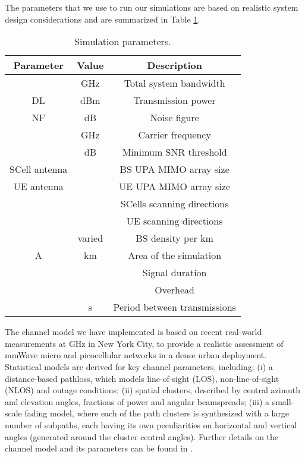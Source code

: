 \documentclass[conference,a4paper]{IEEEtran}
\renewcommand{\arraystretch}{2}
\begin{document}
The parameters that we use to run our simulations are based on realistic system design considerations and are summarized in Table \ref{tab:params}.
 \renewcommand{\arraystretch}{1.3}
\begin{table}[!t]
\centering
\begin{tabular}{|c|c|c|}
\hline
\textbf{Parameter} & \textbf{Value} & \textbf{Description}\\
\toprule
\hline
  &  GHz & Total system bandwidth\\
\hline
DL   &  dBm & Transmission power \\
\hline
 NF  &  dB & Noise figure \\
\hline
 &  GHz & Carrier frequency \\
\hline
 &  dB &  Minimum SNR threshold \\
\hline
  SCell antenna &   & BS UPA MIMO array size  \\
\hline
UE antenna &  & UE UPA MIMO array size\\
\hline
&   & SCells scanning directions  \\
\hline
&   & UE scanning directions  \\
\hline
  & varied & BS density per km \\
\hline
 A &  km & Area of the simulation \\
\hline
 & & Signal duration \\
\hline
 &  & Overhead\\
\hline
 & s & Period between transmissions \\
\hline
\end{tabular}
\caption{Simulation parameters.}
\label{tab:params}
\end{table}

The channel model we have implemented is based on recent real-world measurements at  GHz in New York City, to provide a realistic assessment of mmWave micro and picocellular networks in a dense urban deployment. Statistical models are derived for key channel parameters, including: (i) a distance-based pathloss, which models line-of-sight (LOS), non-line-of-sight (NLOS) and outage conditions; (ii) spatial clusters, described by central azimuth and elevation angles, fractions of power and angular beamspreads;  (iii) a small-scale fading model, where each of the path clusters is synthesized with a large number of subpaths, each  having its own peculiarities on horizontal and vertical angles (generated around the cluster central angles). Further details on the channel model and its parameters can be found in \cite{Mustafa,ns3_nokia,rappaport_channel_model}. 
\end{document}
